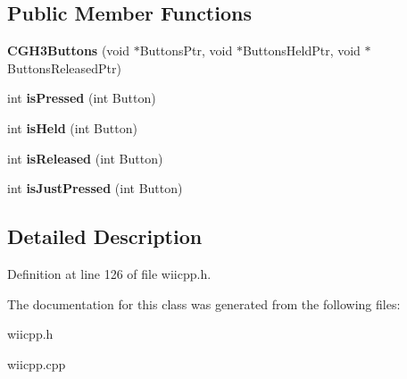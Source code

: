 \subsection*{Public Member Functions}
\begin{DoxyCompactItemize}
\item 
\hypertarget{class_c_g_h3_buttons_ac55bb0fb3a0f63e9ec9df0e013fac45c}{{\bfseries C\-G\-H3\-Buttons} (void $\ast$Buttons\-Ptr, void $\ast$Buttons\-Held\-Ptr, void $\ast$Buttons\-Released\-Ptr)}\label{class_c_g_h3_buttons_ac55bb0fb3a0f63e9ec9df0e013fac45c}

\item 
\hypertarget{class_c_button_base_a0d4758b9e756a8c3c2bb39b907ea9170}{int {\bfseries is\-Pressed} (int Button)}\label{class_c_button_base_a0d4758b9e756a8c3c2bb39b907ea9170}

\item 
\hypertarget{class_c_button_base_a67e38daead9d22e33f6a3d85902d1f98}{int {\bfseries is\-Held} (int Button)}\label{class_c_button_base_a67e38daead9d22e33f6a3d85902d1f98}

\item 
\hypertarget{class_c_button_base_a575dee487bcca1abf29c1084dfdd5bb8}{int {\bfseries is\-Released} (int Button)}\label{class_c_button_base_a575dee487bcca1abf29c1084dfdd5bb8}

\item 
\hypertarget{class_c_button_base_ab74fd21217c5e379a613b7474af4f9b8}{int {\bfseries is\-Just\-Pressed} (int Button)}\label{class_c_button_base_ab74fd21217c5e379a613b7474af4f9b8}

\end{DoxyCompactItemize}


\subsection{Detailed Description}


Definition at line 126 of file wiicpp.\-h.



The documentation for this class was generated from the following files\-:\begin{DoxyCompactItemize}
\item 
wiicpp.\-h\item 
wiicpp.\-cpp\end{DoxyCompactItemize}
